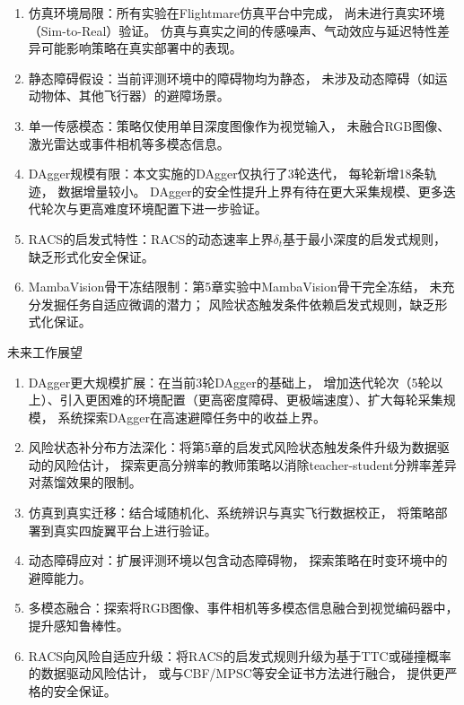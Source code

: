 \begin{conclusion}
\begin{enumerate}
\item 仿真环境局限：所有实验在Flightmare仿真平台中完成，
尚未进行真实环境（Sim-to-Real）验证。
仿真与真实之间的传感噪声、气动效应与延迟特性差异可能影响策略在真实部署中的表现。
 \item 静态障碍假设：当前评测环境中的障碍物均为静态，
未涉及动态障碍（如运动物体、其他飞行器）的避障场景。
 \item 单一传感模态：策略仅使用单目深度图像作为视觉输入，
未融合RGB图像、激光雷达或事件相机等多模态信息。
 \item DAgger规模有限：本文实施的DAgger仅执行了3轮迭代，
每轮新增18条轨迹，
数据增量较小。
DAgger的安全性提升上界有待在更大采集规模、更多迭代轮次与更高难度环境配置下进一步验证。
 \item RACS的启发式特性：RACS的动态速率上界$\delta_t$基于最小深度的启发式规则，
缺乏形式化安全保证。
 \item MambaVision骨干冻结限制：第5章实验中MambaVision骨干完全冻结，
未充分发掘任务自适应微调的潜力；
风险状态触发条件依赖启发式规则，缺乏形式化保证。
 \end{enumerate}

未来工作展望

\begin{enumerate}
\item DAgger更大规模扩展：在当前3轮DAgger的基础上，
增加迭代轮次（5轮以上）、引入更困难的环境配置（更高密度障碍、更极端速度）、扩大每轮采集规模，
系统探索DAgger在高速避障任务中的收益上界。
 \item 风险状态补分布方法深化：将第5章的启发式风险状态触发条件升级为数据驱动的风险估计，
探索更高分辨率的教师策略以消除teacher-student分辨率差异对蒸馏效果的限制。
 \item 仿真到真实迁移：结合域随机化、系统辨识与真实飞行数据校正，
将策略部署到真实四旋翼平台上进行验证。
 \item 动态障碍应对：扩展评测环境以包含动态障碍物，
探索策略在时变环境中的避障能力。
 \item 多模态融合：探索将RGB图像、事件相机等多模态信息融合到视觉编码器中，
提升感知鲁棒性。
 \item RACS向风险自适应升级：将RACS的启发式规则升级为基于TTC或碰撞概率的数据驱动风险估计，
或与CBF/MPSC等安全证书方法进行融合，
提供更严格的安全保证。
 \end{enumerate}

\end{conclusion}
